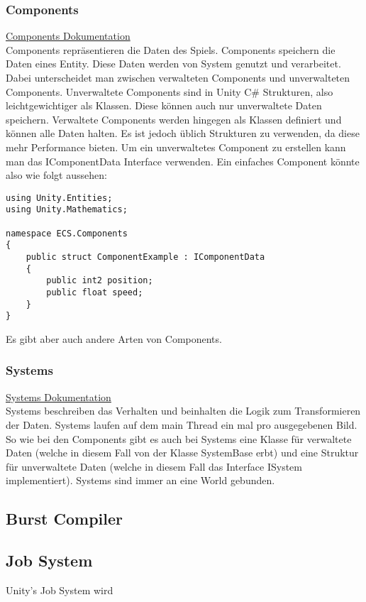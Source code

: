 \documentclass[12pt, titlepage]{article}
\begin{document}
\subsubsection{Components}
\href{https://docs.unity3d.com/Packages/com.unity.entities@1.0/manual/concepts-components.html}{Components Dokumentation}\\Components repräsentieren die Daten des Spiels. Components speichern die Daten eines Entity. Diese Daten werden von System genutzt und verarbeitet. Dabei unterscheidet man zwischen verwalteten Components und unverwalteten Components. Unverwaltete Components sind in Unity C\# Strukturen, also leichtgewichtiger als Klassen. Diese können auch nur unverwaltete Daten speichern. Verwaltete Components werden hingegen als Klassen definiert und können alle Daten halten. Es ist jedoch üblich Strukturen zu verwenden, da diese mehr Performance bieten. Um ein unverwaltetes Component zu erstellen kann man das IComponentData Interface verwenden. Ein einfaches Component könnte also wie folgt aussehen:\begin{lstlisting}[language={[Sharp]C}, caption={Component example}, label={Script}]
using Unity.Entities;
using Unity.Mathematics;

namespace ECS.Components
{
    public struct ComponentExample : IComponentData
    {
        public int2 position;
        public float speed;
    }
}
\end{lstlisting}
Es gibt aber auch andere Arten von Components. 
\subsubsection{Systems}
\href{https://docs.unity3d.com/Packages/com.unity.entities@1.0/manual/concepts-systems.html}{Systems Dokumentation}\\
Systems beschreiben das Verhalten und beinhalten die Logik zum Transformieren der Daten. Systems laufen auf dem main Thread ein mal pro ausgegebenen Bild. So wie bei den Components gibt es auch bei Systems eine Klasse für verwaltete Daten (welche in diesem Fall von der Klasse SystemBase erbt) und eine Struktur für unverwaltete Daten (welche in diesem Fall das Interface ISystem implementiert). Systems sind immer an eine World gebunden.
\subsection{Burst Compiler}
\subsection{Job System}
Unity's Job System wird 
\newpage
\end{document}
